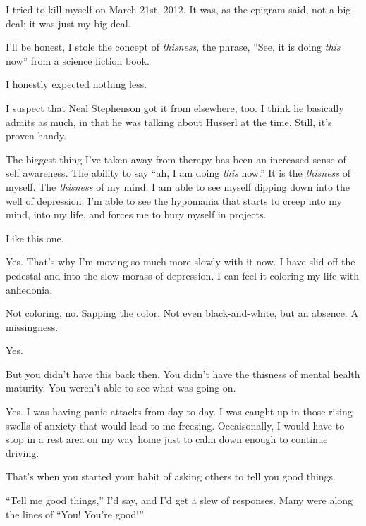 \begin{paracol}{2}
\begin{leftcolumn}
I tried to kill myself on March 21st, 2012. It was, as the epigram said, not a big deal; it was just my big deal.
\newpage

\noindent I'll be honest, I stole the concept of \emph{thisness}, the phrase, ``See, it is doing \emph{this} now'' from a science fiction book.

\begin{ally}
I honestly expected nothing less.
\end{ally}
I suspect that Neal Stephenson got it from elsewhere, too. I think he basically admits as much, in that he was talking about Husserl at the time. Still, it's proven handy.

The biggest thing I've taken away from therapy has been an increased sense of self awareness. The ability to say ``ah, I am doing \emph{this} now.'' It is the \emph{thisness} of myself. The \emph{thisness} of my mind. I am able to see myself dipping down into the well of depression. I'm able to see the hypomania that starts to creep into my mind, into my life, and forces me to bury myself in projects.

\begin{ally}
Like this one.
\end{ally}
Yes. That's why I'm moving so much more slowly with it now. I have slid off the pedestal and into the slow morass of depression. I can feel it coloring my life with anhedonia.

\begin{ally}
Not coloring, no. Sapping the color. Not even black-and-white, but an absence. A missingness.
\end{ally}
Yes.

\begin{ally}
But you didn't have this back then. You didn't have the thisness of mental health maturity. You weren't able to see what was going on.
\end{ally}
Yes. I was having panic attacks from day to day. I was caught up in those rising swells of anxiety that would lead to me freezing. Occaisonally, I would have to stop in a rest area on my way home just to calm down enough to continue driving.

\begin{ally}
That's when you started your habit of asking others to tell you good things.
\end{ally}
``Tell me good things,'' I'd say, and I'd get a slew of responses. Many were along the lines of ``You! You're good!''


\end{leftcolumn}
\end{paracol}
